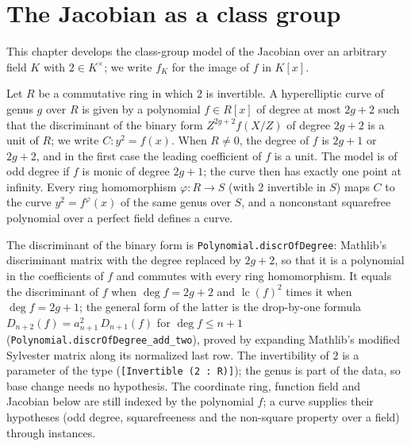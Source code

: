 \chapter{The Jacobian as a class group}
This chapter develops the class-group model of the Jacobian over an arbitrary field $K$
with $2 \in K^\times$; we write $f_K$ for the image of $f$ in $K[x]$.

\begin{definition}
\label{def:hypcurve}
\leanok
Let $R$ be a commutative ring in which $2$ is invertible. A hyperelliptic curve of genus $g$
over $R$ is given by a polynomial $f \in R[x]$ of degree at most $2g + 2$ such that the
discriminant of the binary form $Z^{2g+2} f(X/Z)$ of degree $2g+2$ is a unit of $R$; we write
$C \colon y^2 = f(x)$. When $R \ne 0$, the degree of $f$ is $2g+1$ or $2g+2$, and in the first
case the leading coefficient of $f$ is a unit. The model is of odd degree if $f$ is monic of
degree $2g+1$; the curve then has exactly one point at infinity. Every ring homomorphism
$\varphi \colon R \to S$ (with $2$ invertible in $S$) maps $C$ to the curve
$y^2 = f^\varphi(x)$ of the same genus over $S$, and a nonconstant squarefree polynomial over a
perfect field defines a curve.
\end{definition}

\begin{remark}[Formalization]
The discriminant of the binary form is \texttt{Polynomial.discrOfDegree}: Mathlib's
discriminant matrix with the degree replaced by $2g+2$, so that it is a polynomial in the
coefficients of $f$ and commutes with every ring homomorphism. It equals the discriminant of $f$
when $\deg f = 2g+2$ and $\operatorname{lc}(f)^2$ times it when $\deg f = 2g+1$; the general
form of the latter is the drop-by-one formula $D_{n+2}(f) = a_{n+1}^2\, D_{n+1}(f)$ for
$\deg f \le n+1$ (\texttt{Polynomial.discrOfDegree\_add\_two}), proved by expanding Mathlib's
modified Sylvester matrix along its normalized last row. The invertibility of $2$ is a parameter
of the type (\texttt{[Invertible (2 : R)]}); the genus is part of the data, so base change needs
no hypothesis. The coordinate ring, function field and Jacobian below are still indexed by the
polynomial $f$; a curve supplies their hypotheses (odd degree, squarefreeness and the
non-square property over a field) through instances.
\end{remark}

